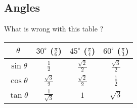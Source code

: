 \subsection{Angles}

What is wrong with this table ?

\begin{table}[H]
    \begin{center}
        \begin{tabular}[c]{|c|c|c|c|}
            \hline
            $\theta$ & $30^\circ$ ($\frac{\pi}{6}$) & $45^\circ$ ($\frac{\pi}{4}$) & $60^\circ$ ($\frac{\pi}{3}$) \\
            \hline
            $\sin\theta$ & $\frac{1}{2}$ & $\frac{\sqrt{2}}{2}$ & $\frac{\sqrt{3}}{2}$ \\
            \hline
            $\cos\theta$ & $\frac{\sqrt{3}}{2}$ & $\frac{\sqrt{2}}{2}$ & $\frac{1}{2}$ \\
            \hline
            $\tan\theta$ & $\frac{1}{\sqrt{3}}$ & $1$ & $\sqrt{3}$ \\
            \hline
        \end{tabular}
    \end{center}
\end{table}
